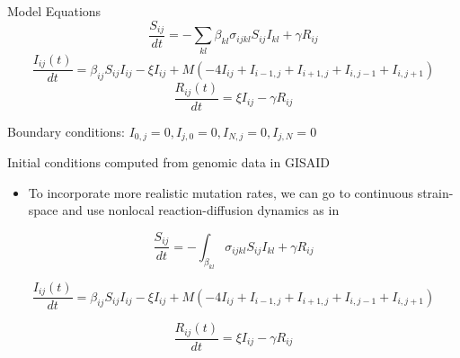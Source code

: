 \documentclass{beamer}
\begin{document}
\begin{frame}{Model Equations}
    \small
    \begin{equation}
        \frac{S_{ij}}{dt} = -\sum_{kl} \beta_{kl} \sigma_{ijkl} S_{ij} I_{kl} + \gamma R_{ij}  \label{Seqn}
    \end{equation}
    \begin{equation}
        \frac{ I_{ij}(t)}{dt} = \beta_{ij} S_{ij} I_{ij} - \xi I_{ij} + M \left(- 4I_{ij} + I_{i-1,j}  + I_{i+1,j} + I_{i,j-1} + I_{i,j+1} \right) \label{Ieqn}    
    \end{equation}
    \begin{equation}
        \frac{R_{ij}(t)}{dt} = \xi I_{ij} - \gamma R_{ij}  \label{Reqn}
    \end{equation}

    Boundary conditions: $I_{0,j} = 0, I_{j,0} = 0,  I_{N,j} = 0, I_{j,N} = 0$

    Initial conditions computed from genomic data in GISAID 
\end{frame}

\begin{frame}{}
    \begin{itemize}
    \item To incorporate more realistic mutation rates, we can go to continuous strain-space and use nonlocal reaction-diffusion dynamics as in \cite{Rouzine_Rozhnova_2018,Bessonov_Bocharov_Meyerhans_Popov_Volpert_2021}
    \end{itemize}

    \small
    \begin{equation}
        \frac{S_{ij}}{dt} = - \int_ \beta_{kl} \sigma_{ijkl} S_{ij} I_{kl} + \gamma R_{ij}  \label{Seqn_2}
    \end{equation}

    \begin{equation}
        \frac{ I_{ij}(t)}{dt} = \beta_{ij} S_{ij} I_{ij} - \xi I_{ij} + M \left(- 4I_{ij} + I_{i-1,j}  + I_{i+1,j} + I_{i,j-1} + I_{i,j+1} \right) \label{Ieqn_2}    
    \end{equation}

    \begin{equation}
        \frac{R_{ij}(t)}{dt} = \xi I_{ij} - \gamma R_{ij}  \label{Reqn_2}
    \end{equation}
\end{frame}

\begin{frame}[allowframebreaks]



\end{frame}
\end{document}
